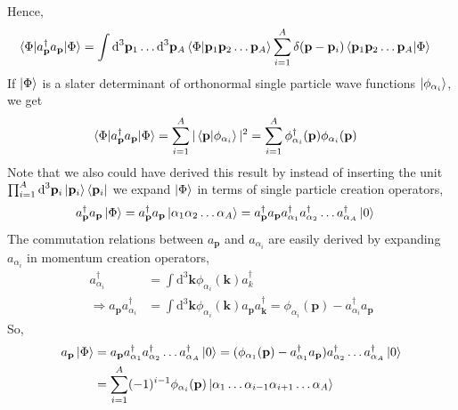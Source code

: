 \documentclass[10pt]{article}
\begin{document}
Hence,
\begin{align}
	\braket{ \Phi | a_{\mathbf{p}}^{\dagger} a_{\mathbf{p}} | \Phi} &= \int \textrm{d}^{3} \mathbf{p}_{1} \ldots \textrm{d}^{3} \mathbf{p}_{A} \braket {\Phi | \mathbf{p}_1 \mathbf{p}_2 \ldots \mathbf{p}_{A}} \sum_{i=1}^{A} \delta(\mathbf{p} - \mathbf{p}_{i}) \braket{ \mathbf{p}_{1} \mathbf{p}_{2} \ldots \mathbf{p}_{A} | \Phi}
\end{align}
If $\ket{\Phi}$ is a slater determinant of orthonormal single particle wave 
functions $\ket{\phi_{\alpha_{i}}}$, we get
\begin{align}
	\braket{ \Phi | a_{\mathbf{p}}^{\dagger} a_{\mathbf{p}} | \Phi} &= \sum_{i=1}^{A} | \braket{ \mathbf{p} | \phi_{\alpha_{i}} } |^{2} = \sum_{i=1}^{A} \phi_{\alpha_i}^{\dagger}(\mathbf{p}) \phi_{\alpha_i}(\mathbf{p})
\end{align}
Note that we also could have derived this result by instead of inserting the unit $\prod_{i=1}^{A} \textrm{d}^{3} \mathbf{p}_{i} \ket{\mathbf{p}_{i}}\bra{\mathbf{p}_{i}}$ we expand $\ket{\Phi}$ in terms of single particle creation operators,
\begin{align}
	a_{\mathbf{p}}^{\dagger} a_{\mathbf{p}} \ket{\Phi} &= a_{\mathbf{p}}^{\dagger} a_{\mathbf{p}} \ket{ \alpha_1 \alpha_2 \ldots \alpha_A } = a_{\mathbf{p}}^{\dagger} a_{\mathbf{p}} a_{\alpha_1}^{\dagger} a_{\alpha_2}^{\dagger} \ldots a_{\alpha_A}^{\dagger} \ket{0}
\end{align}
The commutation relations between $a_{\mathbf{p}}$ and $a_{\alpha_i}$ are easily derived by expanding $a_{\alpha_i}$ in momentum creation operators,
\begin{align}
	a_{\alpha_i}^{\dagger} &= \int \textrm{d}^{3} \mathbf{k} \phi_{\alpha_i}(\mathbf{k}) a_{k}^{\dagger} \\
	\Rightarrow a_{\mathbf{p}} a_{\alpha_i}^{\dagger} &= \int \textrm{d}^{3} \mathbf{k} \phi_{\alpha_i}(\mathbf{k}) a_{\mathbf{p}} a_{\mathbf{k}}^{\dagger} = \phi_{\alpha_i}(\mathbf{p}) - a_{\alpha_i}^{\dagger} a_{\mathbf{p}}
\end{align}
So,
\begin{align}
	a_{\mathbf{p}} \ket{\Phi} &= a_{\mathbf{p}} a_{\alpha_1}^{\dagger} a_{\alpha_2}^{\dagger} \ldots a_{\alpha_A}^{\dagger} \ket{0} = (\phi_{\alpha_1}(\mathbf{p}) - a_{\alpha_1}^{\dagger} a_{\mathbf{p}}) a_{\alpha_2}^{\dagger} \ldots a_{\alpha_A}^{\dagger} \ket{0} \\
	&= \sum_{i=1}^{A} (-1)^{i-1} \phi_{\alpha_{i}}(\mathbf{p}) \ket{ \alpha_1 \ldots \alpha_{i-1} \alpha_{i+1} \ldots \alpha_A}
\end{align}
\end{document}
